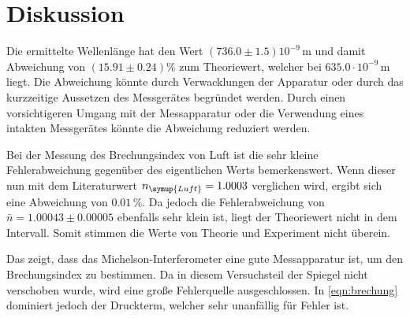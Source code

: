 \section{Diskussion}
\label{sec:Diskussion}

Die ermittelte Wellenlänge hat den Wert $(736.0 \pm 1.5)10^{-9}\, \unit{\meter}$ und damit Abweichung von $(15.91 \pm 0.24)\%$ zum Theoriewert, welcher bei $635.0\cdot 10^{-9}\, \unit{\meter}$ liegt.
Die Abweichung könnte durch Verwacklungen der Apparatur oder durch das kurzzeitige Aussetzen des Messgerätes begründet werden. 
Durch einen vorsichtigeren Umgang mit der Messapparatur oder die Verwendung eines intakten Messgerätes könnte die Abweichung reduziert werden.

Bei der Messung des Brechungsindex  von Luft ist die sehr kleine Fehlerabweichung gegenüber des eigentlichen Werts bemerkenswert. Wenn dieser nun 
mit dem Literaturwert $n_{\symup{Luft}} = 1.0003$ \cite{brechung} verglichen wird, ergibt sich eine Abweichung von $0.01\,\%$. 
Da jedoch die Fehlerabweichung von $\bar{n} = 1.00043 \pm 0.00005$ ebenfalls sehr klein ist, liegt der Theoriewert nicht in dem Intervall. Somit stimmen die 
Werte von Theorie und Experiment nicht überein.

Das zeigt, dass das Michelson-Interferometer 
eine gute Messapparatur ist, um den Brechungsindex zu bestimmen. Da in diesem Versuchsteil der Spiegel nicht verschoben wurde, wird eine große Fehlerquelle 
ausgeschlossen. In \autoref{eqn:brechung} dominiert jedoch der Druckterm, welcher sehr unanfällig für Fehler ist.